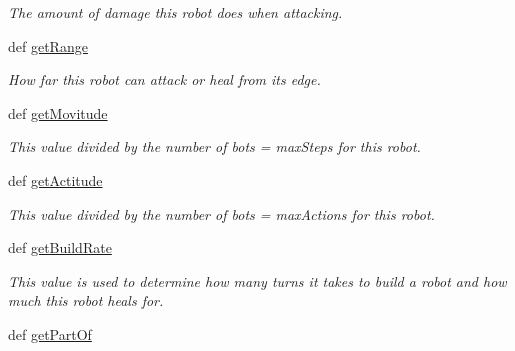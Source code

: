 \begin{DoxyCompactItemize}
\begin{DoxyCompactList}\small\item\em The amount of damage this robot does when attacking. \item\end{DoxyCompactList}\item 
\hypertarget{classGameObject_1_1Bot_a6892f5fd85e000e6052c4073f6fb1398}{
def \hyperlink{classGameObject_1_1Bot_a6892f5fd85e000e6052c4073f6fb1398}{getRange}}
\label{classGameObject_1_1Bot_a6892f5fd85e000e6052c4073f6fb1398}

\begin{DoxyCompactList}\small\item\em How far this robot can attack or heal from its edge. \item\end{DoxyCompactList}\item 
\hypertarget{classGameObject_1_1Bot_aa5ecd238c3fdf1b123dc9e5c2e634121}{
def \hyperlink{classGameObject_1_1Bot_aa5ecd238c3fdf1b123dc9e5c2e634121}{getMovitude}}
\label{classGameObject_1_1Bot_aa5ecd238c3fdf1b123dc9e5c2e634121}

\begin{DoxyCompactList}\small\item\em This value divided by the number of bots = maxSteps for this robot. \item\end{DoxyCompactList}\item 
\hypertarget{classGameObject_1_1Bot_a810470c6f1aeaad5880ac126ca6a532c}{
def \hyperlink{classGameObject_1_1Bot_a810470c6f1aeaad5880ac126ca6a532c}{getActitude}}
\label{classGameObject_1_1Bot_a810470c6f1aeaad5880ac126ca6a532c}

\begin{DoxyCompactList}\small\item\em This value divided by the number of bots = maxActions for this robot. \item\end{DoxyCompactList}\item 
\hypertarget{classGameObject_1_1Bot_a78f4bdba8edf04f46bbe9e02041ce6a1}{
def \hyperlink{classGameObject_1_1Bot_a78f4bdba8edf04f46bbe9e02041ce6a1}{getBuildRate}}
\label{classGameObject_1_1Bot_a78f4bdba8edf04f46bbe9e02041ce6a1}

\begin{DoxyCompactList}\small\item\em This value is used to determine how many turns it takes to build a robot and how much this robot heals for. \item\end{DoxyCompactList}\item 
\hypertarget{classGameObject_1_1Bot_a74143a60984b638ceebccb84056e6474}{
def \hyperlink{classGameObject_1_1Bot_a74143a60984b638ceebccb84056e6474}{getPartOf}}
\label{classGameObject_1_1Bot_a74143a60984b638ceebccb84056e6474}


\end{DoxyCompactItemize}
